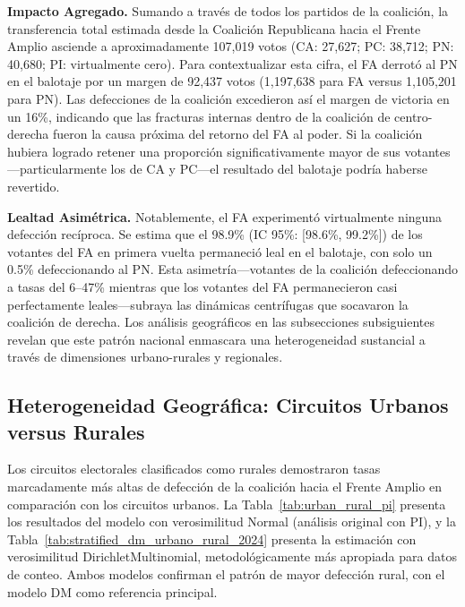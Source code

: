 \textbf{Impacto Agregado.} Sumando a través de todos los partidos de la coalición, la transferencia total estimada desde la Coalición Republicana hacia el Frente Amplio asciende a aproximadamente 107,019 votos (CA: 27,627; PC: 38,712; PN: 40,680; PI: virtualmente cero). Para contextualizar esta cifra, el FA derrotó al PN en el balotaje por un margen de 92,437 votos (1,197,638 para FA versus 1,105,201 para PN). Las defecciones de la coalición excedieron así el margen de victoria en un 16\%, indicando que las fracturas internas dentro de la coalición de centro-derecha fueron la causa próxima del retorno del FA al poder. Si la coalición hubiera logrado retener una proporción significativamente mayor de sus votantes---particularmente los de CA y PC---el resultado del balotaje podría haberse revertido.

\textbf{Lealtad Asimétrica.} Notablemente, el FA experimentó virtualmente ninguna defección recíproca. Se estima que el 98.9\% (IC 95\%: [98.6\%, 99.2\%]) de los votantes del FA en primera vuelta permaneció leal en el balotaje, con solo un 0.5\% defeccionando al PN. Esta asimetría---votantes de la coalición defeccionando a tasas del 6--47\% mientras que los votantes del FA permanecieron casi perfectamente leales---subraya las dinámicas centrífugas que socavaron la coalición de derecha. Los análisis geográficos en las subsecciones subsiguientes revelan que este patrón nacional enmascara una heterogeneidad sustancial a través de dimensiones urbano-rurales y regionales.

\subsection{Heterogeneidad Geográfica: Circuitos Urbanos versus Rurales}
\label{sec:resultados_urbano_rural}

Los circuitos electorales clasificados como rurales demostraron tasas marcadamente más altas de defección de la coalición hacia el Frente Amplio en comparación con los circuitos urbanos. La Tabla~\ref{tab:urban_rural_pi} presenta los resultados del modelo con verosimilitud Normal (análisis original con PI), y la Tabla~\ref{tab:stratified_dm_urbano_rural_2024} presenta la estimación con verosimilitud DirichletMultinomial, metodológicamente más apropiada para datos de conteo. Ambos modelos confirman el patrón de mayor defección rural, con el modelo DM como referencia principal.



